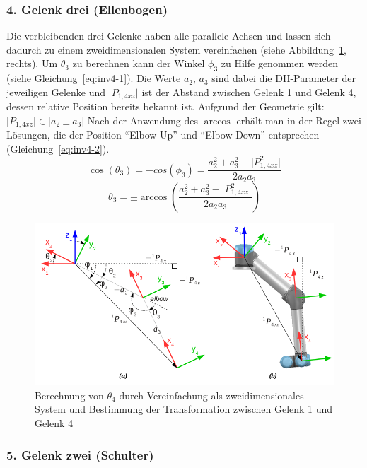 \subsubsection{4. Gelenk drei (Ellenbogen)}

Die verbleibenden drei Gelenke haben alle parallele Achsen und lassen sich dadurch zu einem zweidimensionalen System vereinfachen (siehe Abbildung~\ref{fig:inv1-4}, rechts).
Um $\theta_3$ zu berechnen kann der Winkel $\phi_3$ zu Hilfe genommen werden (siehe Gleichung~\ref{eq:inv4-1}).
Die Werte $a_2$, $a_3$ sind dabei die DH-Parameter der jeweiligen Gelenke und $\lvert P_{1,4xz} \rvert$ ist der Abstand zwischen Gelenk 1 und Gelenk 4, dessen relative Position bereits bekannt ist.
Aufgrund der Geometrie gilt: $\lvert P_{1,4xz} \rvert \in \lvert a_2 \pm a_3 \rvert$
Nach der Anwendung des $\arccos$ erhält man in der Regel zwei Lösungen, die der Position \enquote{Elbow Up} und \enquote{Elbow Down} entsprechen (Gleichung~\ref{eq:inv4-2}).
\begin{equation}
    \cos(\theta_3) = -cos(\phi_3) = \frac{a_2^2 + a_3^2 - \lvert P_{1,4xz}^2 \rvert}{2 a_2 a_3}   \label{eq:inv4-1}
\end{equation}
\begin{equation}
    \theta_3 = \pm \arccos \left(  \frac{a_2^2 + a_3^2 - \lvert P_{1,4xz}^2 \rvert}{2 a_2 a_3} \right)  \label{eq:inv4-2}
\end{equation}
\begin{figure}[h]
    \centering
    \includegraphics[width = .8\textwidth]{Bilder/inv4}
    \caption{Berechnung von $\theta_4$ durch Vereinfachung als zweidimensionales System und Bestimmung der Transformation zwischen Gelenk 1 und Gelenk 4~\cite{rasmusandersenKinematicsUR52018}}\label{fig:inv1-4}
\end{figure}

\subsubsection{5. Gelenk zwei (Schulter)}

